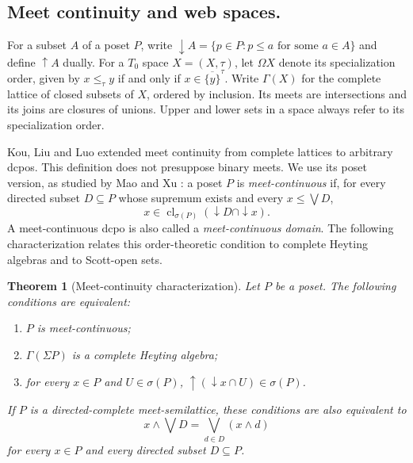 \documentclass[11pt,reqno]{amsart}
\newtheorem{theorem}{Theorem}[section]
\theoremstyle{definition}
\numberwithin{equation}{section}
\begin{document}
\subsection{Meet continuity and web spaces.}
For a subset $A$ of a poset $P$, write
${\downarrow} A=\{p\in P:p\leq a\text{ for some }a\in A\}$ and define
${\uparrow} A$ dually. For a $T_0$ space $X=(X,\tau)$, let $\Omega X$
denote its specialization order, given by
$x\leq_\tau y$ if and only if $x\in\overline{\{y\}}^{\tau}$.
Write $\Gamma(X)$ for the complete lattice of closed subsets of $X$,
ordered by inclusion. Its meets are intersections and its joins are
closures of unions. Upper and lower sets in a space always refer to
its specialization order.

Kou, Liu and Luo \citep{KouLiuLuo2003} extended meet continuity from
complete lattices to arbitrary dcpos. This definition does not
presuppose binary meets. We use its poset version, as studied by Mao
and Xu \citep{MaoXu2009}: a poset $P$ is \emph{meet-continuous} if, for
every directed subset $D\subseteq P$ whose supremum exists and every
$x\leq\bigvee D$,
\begin{equation}\label{eq:mc-closure}
  x\in\operatorname{cl}_{\sigma(P)}
       ({\downarrow} D\cap{\downarrow} x).
\end{equation}
A meet-continuous dcpo is also called a \emph{meet-continuous domain}.
The following characterization relates this order-theoretic condition
to complete Heyting algebras and to Scott-open sets.

\begin{theorem}[Meet-continuity characterization]\label{thm:mc-characterization}
Let $P$ be a poset. The following conditions are equivalent:
\begin{enumerate}
\item[(1)] $P$ is meet-continuous;
\item[(2)] $\Gamma(\Sigma P)$ is a complete Heyting algebra;
\item[(3)] for every $x\in P$ and $U\in\sigma(P)$,
${\uparrow}({\downarrow} x\cap U)\in\sigma(P)$.
\end{enumerate}
If $P$ is a directed-complete meet-semilattice, these conditions are
also equivalent to
\begin{equation}\label{eq:mc-semilattice}
  x\wedge\bigvee D=\bigvee_{d\in D}(x\wedge d)
\end{equation}
for every $x\in P$ and every directed subset $D\subseteq P$.
\end{theorem}
\end{document}
